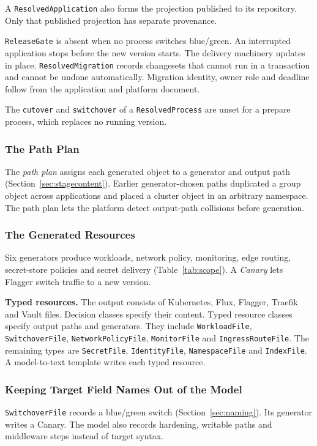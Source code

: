 A \texttt{ResolvedApplication} also forms the projection published to its
repository. Only that published projection has separate provenance.

\texttt{ReleaseGate} is absent when no process switches blue/green. An
interrupted application stops before the new version starts. The delivery
machinery updates in place.
\texttt{ResolvedMigration} records changesets that cannot run in a transaction
and cannot be undone automatically. Migration identity, owner role and deadline
follow from the application and platform document.

The \texttt{cutover} and \texttt{switchover} of a \texttt{ResolvedProcess} are
unset for a prepare process, which replaces no running version.

\subsubsection{The Path Plan}

The \emph{path plan} assigns each generated object to a generator and output
path (Section~\ref{sec:stagecontent}). Earlier generator-chosen paths duplicated
a group object across applications and placed a cluster object in an arbitrary
namespace. The path plan lets the platform detect output-path collisions
before generation.

\subsubsection{The Generated Resources}
\label{sec:generatedresources}

Six generators produce workloads, network policy, monitoring, edge routing,
secret-store policies and secret delivery (Table~\ref{tab:scope}). A
\emph{Canary} lets Flagger switch traffic to a new version.

\textbf{Typed resources.} The output consists of Kubernetes, Flux, Flagger,
Traefik and Vault files. Decision classes specify their content. Typed resource
classes specify output paths and generators. They include
\texttt{WorkloadFile}, \texttt{SwitchoverFile}, \texttt{NetworkPolicyFile},
\texttt{MonitorFile} and \texttt{IngressRouteFile}. The remaining types are
\texttt{SecretFile}, \texttt{IdentityFile}, \texttt{NamespaceFile} and
\texttt{IndexFile}. A model-to-text template writes each typed resource.

\subsubsection{Keeping Target Field Names Out of the Model}

\texttt{SwitchoverFile} records a blue/green switch
(Section~\ref{sec:naming}). Its generator writes a Canary. The model also records
hardening, writable paths and middleware steps instead of target syntax.
